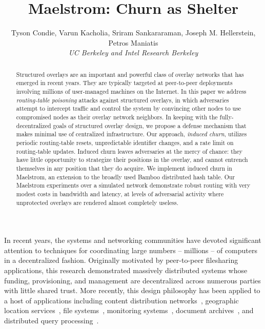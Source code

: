 \documentclass[10pt,twocolumn]{article}
\begin{document}
\title{Maelstrom: Churn as Shelter}
\author{
Tyson Condie, Varun Kacholia, Sriram Sankararaman, Joseph M. Hellerstein, Petros Maniatis\\
\emph{UC Berkeley and Intel Research Berkeley}\\
}


\maketitle

\thispagestyle{empty}
\begin{abstract}
{\small
Structured overlays are an important and powerful class of
overlay networks that has emerged in recent years.  They are typically
targeted at peer-to-peer deployments involving millions of
user-managed machines on the Internet.  In this paper we address
{\em routing-table poisoning} attacks against structured overlays, in
which adversaries attempt to
intercept traffic and control the system by convincing other nodes to
use compromised nodes as their overlay network neighbors.  In keeping
with the fully-decentralized goals of structured overlay design, we propose a defense
mechanism that makes minimal use of centralized infrastructure.  Our
approach, {\em induced churn}, utilizes periodic routing-table resets,
unpredictable identifier changes, and a rate limit on
routing-table updates. Induced churn leaves adversaries at the mercy
of chance: they have little opportunity to strategize their positions
in the overlay, and cannot entrench themselves in any position that
they do acquire.  We implement induced churn in Maelstrom, an extension
to the broadly used Bamboo distributed hash table. Our
Maelstrom experiments over a simulated network demonstrate 
robust routing with very modest costs in bandwidth and latency, at
levels of adversarial activity where unprotected overlays
are rendered almost completely useless.
}
\end{abstract}

\label{sec:introduction}
In recent
years, the systems and networking communities have devoted significant
attention to techniques for coordinating large numbers -- millions
-- of computers in a decentralized fashion.   Originally motivated by
peer-to-peer filesharing applications, this research 
demonstrated massively distributed systems whose funding,
provisioning, and management are decentralized across numerous
parties with little shared trust.  More recently, this design
philosophy has been applied to a host of applications including
content distribution networks~\cite{coral}, geographic location
services~\cite{placelab}, file systems~\cite{cfs},
monitoring systems~\cite{Bharambe2004}, document archives~\cite{overcite}, and distributed query
processing~\cite{Pier}.  
\end{document}
